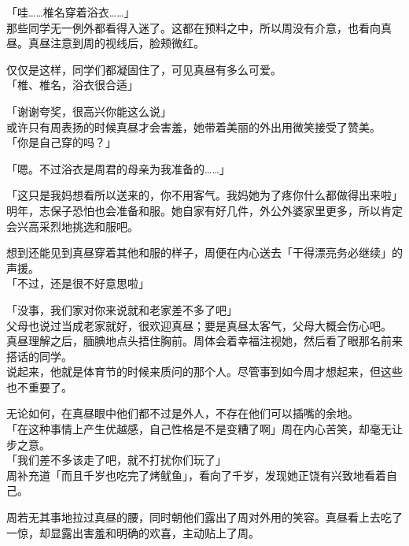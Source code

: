 「哇……椎名穿着浴衣……」\\

那些同学无一例外都看得入迷了。这都在预料之中，所以周没有介意，也看向真昼。真昼注意到周的视线后，脸颊微红。

仅仅是这样，同学们都凝固住了，可见真昼有多么可爱。\\

「椎、椎名，浴衣很合适」

「谢谢夸奖，很高兴你能这么说」\\

或许只有周表扬的时候真昼才会害羞，她带着美丽的外出用微笑接受了赞美。\\

「你是自己穿的吗？」

「嗯。不过浴衣是周君的母亲为我准备的……」

「这只是我妈想看所以送来的，你不用客气。我妈她为了疼你什么都做得出来啦」\\

明年，志保子恐怕也会准备和服。她自家有好几件，外公外婆家里更多，所以肯定会兴高采烈地挑选和服吧。

想到还能见到真昼穿着其他和服的样子，周便在内心送去「干得漂亮务必继续」的声援。\\

「不过，还是很不好意思啦」

「没事，我们家对你来说就和老家差不多了吧」\\

父母也说过当成老家就好，很欢迎真昼；要是真昼太客气，父母大概会伤心吧。\\

真昼理解之后，腼腆地点头捂住胸前。周体会着幸福注视她，然后看了眼那名前来搭话的同学。\\

说起来，他就是体育节的时候来质问的那个人。尽管事到如今周才想起来，但这些也不重要了。

无论如何，在真昼眼中他们都不过是外人，不存在他们可以插嘴的余地。\\

「在这种事情上产生优越感，自己性格是不是变糟了啊」周在内心苦笑，却毫无让步之意。\\

「我们差不多该走了吧，就不打扰你们玩了」\\

周补充道「而且千岁也吃完了烤鱿鱼」，看向了千岁，发现她正饶有兴致地看着自己。

周若无其事地拉过真昼的腰，同时朝他们露出了周对外用的笑容。真昼看上去吃了一惊，却显露出害羞和明确的欢喜，主动贴上了周。\\

